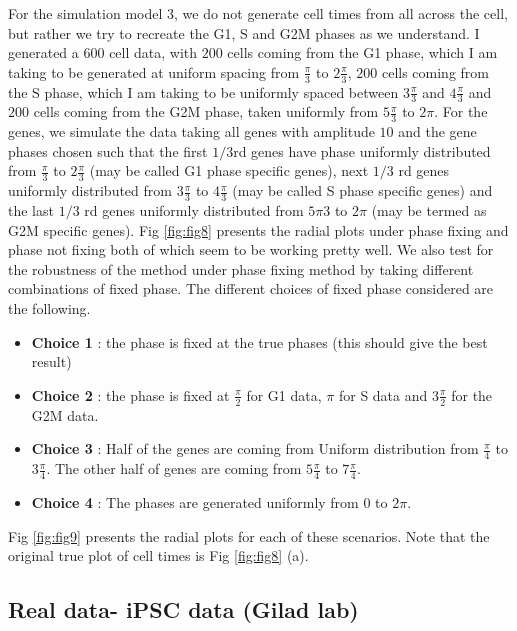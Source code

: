 \documentclass[11pt]{article}
\begin{document}
For the simulation model 3, we do not generate cell times from all across the cell, but rather we try to recreate the G1, S and G2M phases as we understand.  I generated a $600$ cell data, with $200$ cells coming from the G1 phase, which I am taking to be generated at uniform spacing from $\frac{\pi}{3}$ to $2 \frac{\pi}{3}$, $200$ cells coming from the S phase, which I am taking to be uniformly spaced between $3 \frac{\pi}{3}$ and  $4\frac{\pi}{3}$ and $200$ cells coming from the G2M phase, taken uniformly from $5 \frac{\pi}{3}$ to $2 \pi$. For the genes, we simulate the data taking all genes with amplitude $10$ and the gene phases chosen such that the first $1/3$rd genes have phase uniformly distributed from $\frac{\pi}{3}$ to $2 \frac{\pi}{3}$ (may be called G1 phase specific genes), next $1/3$ rd genes uniformly distributed from $3 \frac{\pi}{3}$ to $4 \frac{\pi}{3}$ (may be called S phase specific genes) and the last $1/3$ rd genes uniformly distributed from $5 {\pi}{3}$ to $2 \pi$ (may be termed as G2M specific genes). Fig \ref{fig:fig8} presents the radial plots under phase fixing and phase not fixing both of which seem to be working pretty well.
We also test for the robustness of the method under phase fixing method by taking different combinations of fixed phase. The different choices of fixed phase considered are the following.

\begin{itemize}

\item \textbf{Choice 1} :  the phase is fixed at the true phases (this should give the best result)
\item \textbf{Choice 2} :  the phase is fixed at $\frac{\pi}{2}$ for G1 data, $\pi$ for S data and $3 \frac{\pi}{2}$ for the G2M data.
\item \textbf{Choice 3} :  Half of the genes are coming from Uniform distribution from $\frac{\pi}{4}$ to $3 \frac{\pi}{4}$. The other half of genes are coming from $5 \frac{\pi}{4}$ to $7 \frac{\pi}{4}$.
\item \textbf{Choice 4} : The phases are generated uniformly from $0$ to $2 \pi$.

\end{itemize}

Fig \ref{fig:fig9} presents the radial plots for each of these scenarios. Note that the original true plot of cell times is Fig \ref{fig:fig8} (a).



\subsection{Real data- iPSC data (Gilad lab)}
\end{document}
